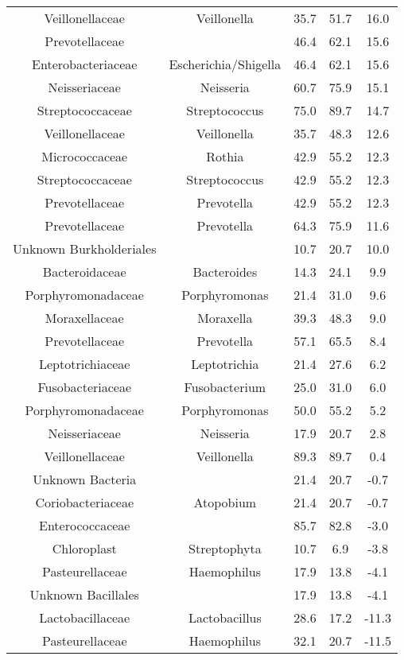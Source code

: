 \begin{center}
\begin{longtable}{ccccc}
	Veillonellaceae & Veillonella & 35.7 & 51.7 & 16.0 \\
	Prevotellaceae &  & 46.4 & 62.1 & 15.6 \\
	Enterobacteriaceae & Escherichia/Shigella & 46.4 & 62.1 & 15.6 \\
	Neisseriaceae & Neisseria & 60.7 & 75.9 & 15.1 \\
	Streptococcaceae & Streptococcus & 75.0 & 89.7 & 14.7 \\
	Veillonellaceae & Veillonella & 35.7 & 48.3 & 12.6 \\
	Micrococcaceae & Rothia & 42.9 & 55.2 & 12.3 \\
	Streptococcaceae & Streptococcus & 42.9 & 55.2 & 12.3 \\
	Prevotellaceae & Prevotella & 42.9 & 55.2 & 12.3 \\
	Prevotellaceae & Prevotella & 64.3 & 75.9 & 11.6 \\
	Unknown Burkholderiales &  & 10.7 & 20.7 & 10.0 \\
	Bacteroidaceae & Bacteroides & 14.3 & 24.1 & 9.9 \\
	Porphyromonadaceae & Porphyromonas & 21.4 & 31.0 & 9.6 \\
	Moraxellaceae & Moraxella & 39.3 & 48.3 & 9.0 \\
	Prevotellaceae & Prevotella & 57.1 & 65.5 & 8.4 \\
	Leptotrichiaceae & Leptotrichia & 21.4 & 27.6 & 6.2 \\
	Fusobacteriaceae & Fusobacterium & 25.0 & 31.0 & 6.0 \\
	Porphyromonadaceae & Porphyromonas & 50.0 & 55.2 & 5.2 \\
	Neisseriaceae & Neisseria & 17.9 & 20.7 & 2.8 \\
	Veillonellaceae & Veillonella & 89.3 & 89.7 & 0.4 \\
	Unknown Bacteria &  & 21.4 & 20.7 & -0.7 \\
	Coriobacteriaceae & Atopobium & 21.4 & 20.7 & -0.7 \\
	Enterococcaceae &  & 85.7 & 82.8 & -3.0 \\
	Chloroplast & Streptophyta & 10.7 & 6.9 & -3.8 \\
	Pasteurellaceae & Haemophilus & 17.9 & 13.8 & -4.1 \\
	Unknown Bacillales &  & 17.9 & 13.8 & -4.1 \\
	Lactobacillaceae & Lactobacillus & 28.6 & 17.2 & -11.3 \\
	Pasteurellaceae & Haemophilus & 32.1 & 20.7 & -11.5 \\

\end{longtable}
\end{center}
